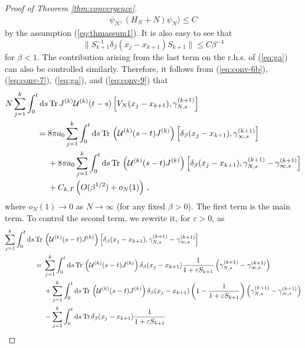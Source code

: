 \documentclass[11pt]{article}
\newcommand{\rd}{{\rm d}}
\newcommand{\e}{\varepsilon}
\newcommand{\cU}{{\cal U}}
\newcommand{\tr}{\mbox{Tr}}
\begin{document}
\begin{proof}[Proof of Theorem \ref{thm:convergence}]
\begin{equation}
\begin{split}
\psi_{N}, (H_N +N)  \psi_{N} \rangle \leq C
\end{split}
\end{equation}
by the assumption (\ref{eq:thmassum1}). It is also easy to see that
\begin{equation}
\| S_{k+1}^{-1} \delta_{\beta} (x_j -x_{k+1}) S_{k+1} \| \leq C
\beta^{-4}
\end{equation}
for $\beta <1$. The contribution arising from the last term on the
r.h.s. of (\ref{eq:ga}) can also be controlled similarly. Therefore,
it follows from (\ref{eq:conv-6b}), (\ref{eq:conv-7}),
(\ref{eq:ga}), and (\ref{eq:conv-9}) that
\begin{equation}\label{eq:conv-10}
\begin{split}
N \sum_{j=1}^k \int_0^t \rd s &\, \tr \, J^{(k)} \cU^{(k)} (t-s)
\left[ V_N (x_j -x_{k+1}) , \gamma_{N,s}^{(k+1)} \right]
\\
= \; & 8\pi a_0  \sum_{j=1}^k \int_0^t \rd s \, \tr \, \left(\cU^{(k)}
(s-t) J^{(k)}\right) \left[ \delta_{\beta} (x_j -x_{k+1}),
 \gamma_{\infty,s}^{(k+1)} \right] \\
&+8\pi a_0 \sum_{j=1}^k \int_0^t \rd s \, \tr \,
\left(\cU^{(k)} (s-t) J^{(k)}\right) \left[ \delta_{\beta} (x_j
-x_{k+1}),
\gamma_{N,s}^{(k+1)} - \gamma_{\infty,s}^{(k+1)} \right] \\
&+C_{k,T} \left(  O(\beta^{1/2}) + o_N (1) \right)\,,
\end{split}
\end{equation}
where $o_N(1) \to 0$ as $N \to \infty$ (for any fixed $\beta >0$).
The first term is the main term.
To control the second term, we rewrite it, for $\e
>0$, as
\begin{equation}\label{eq:conv-11}
\begin{split}
\sum_{j=1}^k \int_0^t \rd s \, \tr \, &\left(\cU^{(k)} (s-t)
J^{(k)}\right) \left[ \delta_{\beta} (x_j -x_{k+1}),
\gamma_{N,s}^{(k+1)} - \gamma_{\infty,s}^{(k+1)} \right] \\ = \;
&\sum_{j=1}^k \int_0^t \rd s \, \tr\,\left(\cU^{(k)} (s-t)
J^{(k)}\right) \delta_{\beta} (x_j -x_{k+1}) \frac{1}{1+\e S_{k+1}}
\left(\gamma_{N,s}^{(k+1)} -  \gamma_{\infty,s}^{(k+1)} \right)
\\&+ \sum_{j=1}^k \int_0^t \rd s \, \tr\,\left(\cU^{(k)} (s-t)
J^{(k)}\right) \delta_{\beta} (x_j -x_{k+1}) \left( 1-\frac{1}{1+\e
S_{k+1}}\right) \left(\gamma_{N,s}^{(k+1)} -
\gamma_{\infty,s}^{(k+1)} \right)\\ &- \sum_{j=1}^k \int_0^t \rd s\,
\tr \, \delta_{\beta} (x_j -x_{k+1}) \frac{1}{1+\e S_{k+1}}

\end{split}
\end{equation}
\end{proof}
\end{document}
